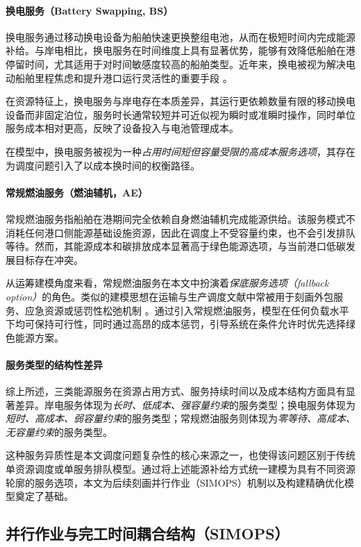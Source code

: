 \documentclass[UTF8, a4paper, 12pt]{ctexart}
\begin{document}
\paragraph{换电服务（Battery Swapping, BS）}
换电服务通过移动换电设备为船舶快速更换整组电池，从而在极短时间内完成能源补给。与岸电相比，换电服务在时间维度上具有显著优势，能够有效降低船舶在港停留时间，尤其适用于对时间敏感度较高的船舶类型。近年来，换电被视为解决电动船舶里程焦虑和提升港口运行灵活性的重要手段 \cite{Zhang2022_EShip,Bei2024}。

在资源特征上，换电服务与岸电存在本质差异，其运行更依赖数量有限的移动换电设备而非固定泊位，服务时长通常较短并可近似视为瞬时或准瞬时操作，同时单位服务成本相对更高，反映了设备投入与电池管理成本。

在模型中，换电服务被视为一种\emph{占用时间短但容量受限的高成本服务选项}，其存在为调度问题引入了以成本换时间的权衡路径。

\paragraph{常规燃油服务（燃油辅机，AE）}
常规燃油服务指船舶在港期间完全依赖自身燃油辅机完成能源供给。该服务模式不消耗任何港口侧能源基础设施资源，因此在调度上不受容量约束，也不会引发排队等待。然而，其能源成本和碳排放成本显著高于绿色能源选项，与当前港口低碳发展目标存在冲突。

从运筹建模角度来看，常规燃油服务在本文中扮演着\emph{保底服务选项（fallback option）}的角色。类似的建模思想在运输与生产调度文献中常被用于刻画外包服务、应急资源或惩罚性松弛机制 \cite{Cordeau2015,pinedo2016scheduling}。通过引入常规燃油服务，模型在任何负载水平下均可保持可行性，同时通过高昂的成本惩罚，引导系统在条件允许时优先选择绿色能源方案。

\paragraph{服务类型的结构性差异}
综上所述，三类能源服务在资源占用方式、服务持续时间以及成本结构方面具有显著差异。岸电服务体现为\emph{长时、低成本、强容量约束}的服务类型；换电服务体现为\emph{短时、高成本、弱容量约束}的服务类型；常规燃油服务则体现为\emph{零等待、高成本、无容量约束}的服务类型。

这种服务异质性是本文调度问题复杂性的核心来源之一，也使得该问题区别于传统单资源调度或单服务排队模型。通过将上述能源补给方式统一建模为具有不同资源轮廓的服务选项，本文为后续刻画并行作业（SIMOPS）机制以及构建精确优化模型奠定了基础。


\subsection{并行作业与完工时间耦合结构（SIMOPS）}
\label{sec:simops_structure}
\end{document}

